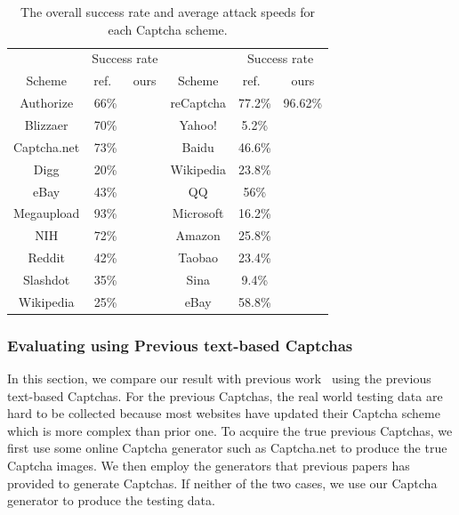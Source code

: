 \begin{table}[t]
    \centering
    \caption{The overall success rate and average attack speeds for each Captcha scheme.}
    \label{table: overall_rate}
    \small
    \begin{tabular}{|c|c|c|c|c|c|}
        \hline
        & \multicolumn{2}{|c|}{Success rate}& & \multicolumn{2}{|c|}{Success rate}\\
        \cline{2-3} \cline{5-6}
        \multirow{-2}{*}{Scheme} & ref.~\cite{Bursztein2011Text} & ours & \multirow{-2}{*}{Scheme} & ref.~\cite{Gao2016A} & ours \\
        \hline
        Authorize & 66\% & & reCaptcha & 77.2\% & 96.62\% \\
        \hline
        Blizzaer & 70\% & & Yahoo! & 5.2\% & \\
        \hline
        Captcha.net & 73\% & & Baidu & 46.6\% & \\
        \hline
        Digg & 20\% & & Wikipedia & 23.8\% & \\
        \hline
        eBay & 43\% & & QQ & 56\% & \\
        \hline
        Megaupload & 93\% & & Microsoft & 16.2\% & \\
        \hline
        NIH & 72\% & & Amazon & 25.8\% & \\
        \hline
        Reddit & 42\% & & Taobao & 23.4\% & \\
        \hline
        Slashdot & 35\% & & Sina & 9.4\% & \\
        \hline
        Wikipedia & 25\% & & eBay & 58.8\% & \\
        \hline
    \end{tabular}
\end{table}

\subsubsection{Evaluating using Previous text-based Captchas}
In this section, we compare our result with previous work~\cite{Bursztein2011Text,Gao2016A} using the previous text-based Captchas.
For the previous Captchas, the real world testing data are hard to be collected because most websites have updated their Captcha scheme which is more complex than prior one. To acquire the true previous Captchas, we first use some online Captcha generator such as Captcha.net to produce the true Captcha images. We then employ the generators that previous papers has provided to generate Captchas. If neither of the two cases, we use our Captcha generator to produce the testing data.

